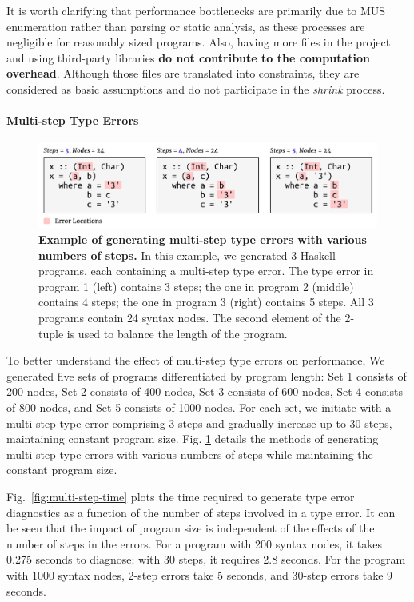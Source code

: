 \documentclass[pdflatex,lineno,sn-nature,Numbered]{sn-jnl}%
\begin{document}
It is worth clarifying that performance bottlenecks are primarily due to MUS enumeration rather than parsing or static analysis, as these processes are negligible for reasonably sized programs. Also, having more files in the project and using third-party libraries {\bf do not contribute to the computation overhead}. Although those files are translated into constraints, they are considered as basic assumptions and do not participate in the {\it shrink} process.

\paragraph{Multi-step Type Errors}

\begin{figure}[ht]
    \centering
    \includegraphics[width=\linewidth]{images/MultiStepMutation}
    \caption{{\bf Example of generating multi-step type errors with various numbers of steps.} In this example, we generated 3 Haskell programs, each containing a multi-step type error. The type error in program 1 (left) contains 3 steps; the one in program 2 (middle) contains 4 steps; the one in program 3 (right) contains 5 steps. All 3 programs contain 24 syntax nodes. The second element of the 2-tuple is used to balance the length of the program. }
    \label{fig:multi-step-mutation}
\end{figure}

To better understand the effect of multi-step type errors on performance,
We generated five sets of programs differentiated by program length: Set 1 consists of 200 nodes, Set 2 consists of 400 nodes, Set 3 consists of 600 nodes, Set 4 consists of 800 nodes, and Set 5 consists of 1000 nodes. For each set, we initiate with a multi-step type error comprising 3 steps and gradually increase up to 30 steps, maintaining constant program size. Fig. \ref{fig:multi-step-mutation} details the methods of generating multi-step type errors with various numbers of steps while maintaining the constant program size.

Fig.~\ref{fig:multi-step-time} plots the time required to generate type error diagnostics as a function of the number of steps involved in a type error.  It can be seen that the impact of program size is independent of the effects of the number of steps in the errors. For a program with 200 syntax nodes, it takes 0.275 seconds to diagnose; with 30 steps, it requires 2.8 seconds. For the program with 1000 syntax nodes, 2-step errors take 5 seconds, and 30-step errors take 9 seconds.
\end{document}
